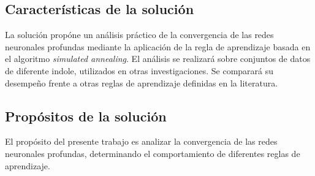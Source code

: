 \begin{comment}
La solución a este problema de minimización para obtener el vector de peso $\vec{w}$ se encuentra mediante el procedimiento estándar para un problema con restricciones de desigualdad en la aplicación de las condiciones de Kuhn-Tuker al problema dual. La principal ventaja del uso del parámetro $v$ es poder controlar el error y el número de \sv\, con un solo parámetro normalizado.

Para resolver el problema de la regresión no lineal basta con cambiar el producto interno entre dos variables independientes $\vec{x_i}\cdot\vec{x_j}$ por una función Kernel $K(\Phi(\vec{x_i})\cdot\Phi(\vec{x_j}))$. Algunas funciones Kernel que se puede utilizar puede ser la función de base radial gaussiano ($RBF$)
\end{comment}

\subsection{Características de la solución}
La solución propóne un análisis práctico de la convergencia de las redes neuronales profundas mediante la aplicación de la regla de aprendizaje basada en el algoritmo {\em simulated annealing}. El análisis se realizará sobre conjuntos de datos de diferente indole, utilizados en otras investigaciones. Se comparará su desempeño frente a otras reglas de aprendizaje definidas en la literatura.

\subsection{Propósitos de la solución}
El propósito del presente trabajo es analizar la convergencia de las redes neuronales profundas, determinando el comportamiento de diferentes reglas de aprendizaje.


